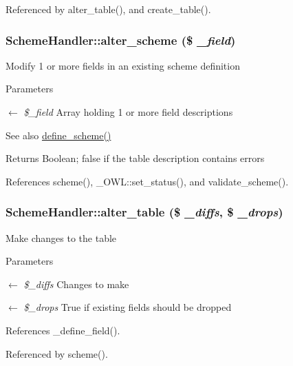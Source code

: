 Referenced by alter\_\-table(), and create\_\-table().

\subsubsection[{alter\_\-scheme}]{\setlength{\rightskip}{0pt plus 5cm}SchemeHandler::alter\_\-scheme (\$ {\em \_\-field})}\label{classSchemeHandler_aa8948e6382f7d19302a255ff0619765c}
Modify 1 or more fields in an existing scheme definition 
\begin{DoxyParams}{Parameters}
\item[\mbox{$\leftarrow$} {\em \$\_\-field}]Array holding 1 or more field descriptions \end{DoxyParams}
\begin{DoxySeeAlso}{See also}
\hyperlink{classSchemeHandler_a07f6b7c5ac78e88f32584b90da53776b}{define\_\-scheme()}
\end{DoxySeeAlso}
\begin{DoxyReturn}{Returns}
Boolean; false if the table description contains errors 
\end{DoxyReturn}


References scheme(), \_\-OWL::set\_\-status(), and validate\_\-scheme().

\subsubsection[{alter\_\-table}]{\setlength{\rightskip}{0pt plus 5cm}SchemeHandler::alter\_\-table (\$ {\em \_\-diffs}, \/  \$ {\em \_\-drops})}\label{classSchemeHandler_a7652ae28d0407f5be24fd67ad1b79e8d}
Make changes to the table 
\begin{DoxyParams}{Parameters}
\item[\mbox{$\leftarrow$} {\em \$\_\-diffs}]Changes to make \item[\mbox{$\leftarrow$} {\em \$\_\-drops}]True if existing fields should be dropped \end{DoxyParams}


References \_\-define\_\-field().



Referenced by scheme().

